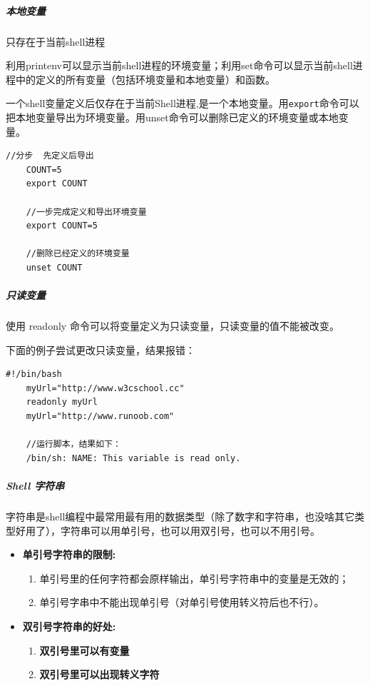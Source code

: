 \documentclass[UTF8,a4paper,12pt]{ctexbook}
\begin{document}
				 \subparagraph{本地变量}只存在于当前shell进程
				 
				 利用printenv可以显示当前shell进程的环境变量；利用set命令可以显示当前shell进程中的定义的所有变量（包括环境变量和本地变量）和函数。
				 
				 一个shell变量定义后仅存在于当前Shell进程,是一个本地变量。用\verb|export|命令可以把本地变量导出为环境变量。用unset命令可以删除已定义的环境变量或本地变量。
					 \begin{lstlisting}[frame=L,xleftmargin=.06\textwidth]
	//分步  先定义后导出
	COUNT=5
	export COUNT
	
	//一步完成定义和导出环境变量
	export COUNT=5 
	
	//删除已经定义的环境变量
	unset COUNT
					 \end{lstlisting}
				
				\subparagraph{只读变量}
					使用 readonly 命令可以将变量定义为只读变量，只读变量的值不能被改变。
					
					下面的例子尝试更改只读变量，结果报错：
					\begin{lstlisting}[frame=L,xleftmargin=.06\textwidth]
	#!/bin/bash
	myUrl="http://www.w3cschool.cc"
	readonly myUrl
	myUrl="http://www.runoob.com"
	
	//运行脚本，结果如下：
	/bin/sh: NAME: This variable is read only.
					\end{lstlisting}

			\subparagraph{Shell 字符串}
				字符串是shell编程中最常用最有用的数据类型（除了数字和字符串，也没啥其它类型好用了），字符串可以用单引号，也可以用双引号，也可以不用引号。
				\begin{itemize}
					\item \textbf{单引号字符串的限制:}
						\begin{enumerate}
							\item 单引号里的任何字符都会原样输出，单引号字符串中的变量是无效的；
							\item 单引号字串中不能出现单引号（对单引号使用转义符后也不行）。
						\end{enumerate}
					
					\item \textbf{双引号字符串的好处:}
						\begin{enumerate}
							\item \textbf{双引号里可以有变量}
							\item \textbf{双引号里可以出现转义字符}
						\end{enumerate}
				\end{itemize}
				
\end{document}
